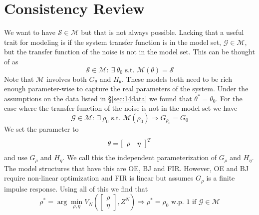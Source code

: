 \section{Consistency Review}
We want to have $\mathcal{S}\in\mathcal{M}$ but that is not always possible. Lacking that a useful trait for modeling is if the system transfer function is in the model set, $\mathcal{G}\in\mathcal{M}$, but the transfer function of the noise is not in the model set. This can be thought of as
$$\mathcal{S}\in\mathcal{M}:~\exists~\theta_0 \text{ s.t. } \mathcal{M}(\theta)=\mathcal{S}$$
Note that $\mathcal{M}$ involves both $G_\theta$ and $H_\theta$. These models both need to be rich enough parameter-wise to capture the real parameters of the system. Under the assumptions on the data listed in \S\ref{sec:14data} we found that $\theta^\ast=\theta_0$. For the case where the transfer function of the noise is not in the model set we have
$$\mathcal{G}\in\mathcal{M}:~\exists~\rho_0 \text{ s.t. } \mathcal{M}(\rho_0) \Rightarrow G_{\rho_0}=G_0$$
We set the parameter to
$$\theta = \left[\begin{array}{c c} \rho & \eta \end{array}\right]^T$$
and use $G_\rho$ and $H_\eta$. We call this the independent parameterization of $G_\rho$ and $H_\eta$. The model structures that have this are OE, BJ and FIR. However, OE and BJ require non-linear optimization and FIR is linear but assumes $G_\rho$ is a finite impulse response. Using all of this we find that
$$\rho^\ast = \arg\min_{\rho,\eta} V_N\left(\left[\begin{array}{c} \rho \\ \eta \end{array}\right],Z^N\right) \Rightarrow \rho^\ast = \rho_0 \text{ w.p. } 1 \text{ if } \mathcal{G}\in\mathcal{M}$$


